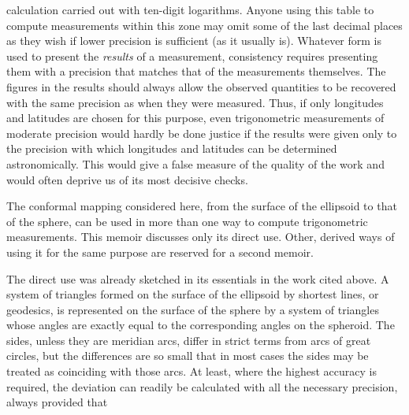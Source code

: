 %
calculation carried out with ten-digit logarithms. Anyone using this table to compute measurements within this zone may omit some of the last decimal places as they wish if lower precision is sufficient (as it usually is). Whatever form is used to present the \textit{results} of a measurement, consistency requires presenting them with a precision that matches that of the measurements themselves. The figures in the results should always allow the observed quantities to be recovered with the same precision as when they were measured. Thus, if only longitudes and latitudes are chosen for this purpose, even trigonometric measurements of moderate precision would hardly be done justice if the results were given only to the precision with which longitudes and latitudes can be determined astronomically. This would give a false measure of the quality of the work and would often deprive us of its most decisive checks.

\indent The conformal mapping considered here, from the surface of the ellipsoid to that of the sphere, can be used in more than one way to compute trigonometric measurements. This memoir discusses only its direct use. Other, derived ways of using it for the same purpose are reserved for a second memoir.

The direct use was already sketched in its essentials in the work cited above. A system of triangles formed on the surface of the ellipsoid by shortest lines, or geodesics, is represented on the surface of the sphere by a system of triangles whose angles are exactly equal to the corresponding angles on the spheroid. The sides, unless they are meridian arcs, differ in strict terms from arcs of great circles, but the differences are so small that in most cases the sides may be treated as coinciding with those arcs. At least, where the highest accuracy is required, the deviation can readily be calculated with all the necessary precision, always provided that
